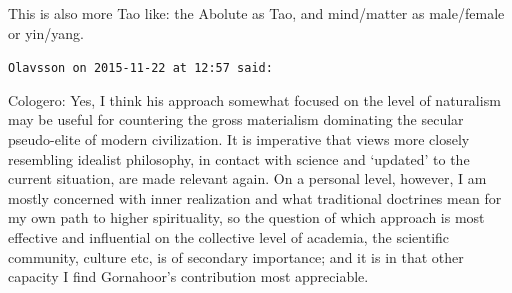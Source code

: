 \begin{footnotesize}
\begin{sffamily}
This is also more Tao like: the Abolute as Tao, and mind/matter as male/female or yin/yang.


\hfill

\texttt{Olavsson on 2015-11-22 at 12:57 said: }

Cologero: Yes, I think his approach somewhat focused on the level of naturalism may be useful for countering the gross
materialism dominating the secular pseudo-elite of modern civilization. It is imperative that views more closely
resembling idealist philosophy, in contact with science and `updated' to the current situation,
are made relevant again. On a personal level, however, I am mostly concerned with inner realization and what
traditional doctrines mean for my own path to higher spirituality, so the question of which approach is most effective
and influential on the collective level of academia, the scientific community, culture etc, is of secondary importance;
and it is in that other capacity I find Gornahoor's contribution most appreciable.


\end{sffamily}
\end{footnotesize}
